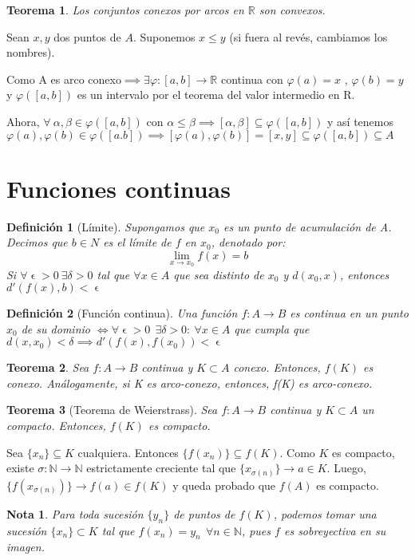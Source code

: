 \documentclass[11pt, a4paper]{article}
\makeatletter
\let\epsilon\upvarepsilon
\renewenvironment{proof}[1][\proofname] {\vspace{-15pt}\par\pushQED{\qed}\normalfont\topsep6\p@\@plus6\p@\relax\trivlist\item[\hskip\labelsep\it#1\@addpunct{.}]\ignorespaces}{\popQED\endtrivlist\@endpefalse}
\newcommand{\R}{\mathbb{R}}
\theoremstyle{theorem-style}
\newtheorem*{nth}{Teorema}
\theoremstyle{definition-style}
\newtheorem*{ndef}{Definición}
\theoremstyle{remark-style}
\newtheorem*{nota}{Nota}
\theoremstyle{example-style}
\makeatother
\begin{document}
\begin{nth}
	Los conjuntos conexos por arcos en $\mathbb{R}$ son convexos.
\end{nth}
\begin{proof}
Sean $x,y$ dos puntos de $A$. Suponemos $x \leq y$ (si fuera al revés, cambiamos los nombres).

Como A es arco conexo$\implies \exists \varphi:[a,b]\to \R$ continua con $\varphi(a) = x$	, $\varphi(b) = y$ y $\varphi([a,b])$ es un intervalo por el teorema del valor intermedio en R.

Ahora, $\forall \ \alpha, \beta \in \varphi([a,b])$ con $\alpha \leq \beta \implies [\alpha,\beta ]  \subseteq \varphi([a,b]) $ y así tenemos $\varphi(a), \varphi(b) \in \varphi([a.b]) \implies [\varphi(a),\varphi(b)] = [x,y] \subseteq \varphi([a,b])\subseteq A$
\end{proof}



\section{Funciones continuas}

\begin{ndef}[Límite]
	Supongamos que $x_0$ es un punto de acumulación de A. Decimos que $b\in N$ es el límite de $f$ en $x_0$, denotado por:
	\[
	\lim_{x\to x_0}f(x) = b
	\]
	Si $\forall\epsilon > 0  \ \exists \delta > 0 $ tal que $\forall x \in A$ que sea distinto de $x_0$ y $d(x_0,x)$, entonces $d'(f(x),b) < \epsilon$ 
\end{ndef}

\begin{ndef}[Función continua]
	Una función $f:A \to B$ es continua en un punto $x_0$ de su dominio $\iff \forall \epsilon > 0 \ \ \exists \delta > 0 : \ \forall x \in A$ que cumpla que $d(x,x_0)< \delta \implies d'(f(x),f(x_0)) < \epsilon$
\end{ndef}

\begin{nth}
	Sea $f:A \to B$ continua y $K \subset A$ conexo. Entonces, $f(K)$ es conexo. Análogamente, si K es arco-conexo, entonces, f(K) es arco-conexo.
\end{nth}

\begin{nth}[Teorema de Weierstrass]
Sea $f:A \to B$ continua y $K\subset A$ un compacto. Entonces, $f(K)$ es compacto.	
\end{nth}
\begin{proof}
	Sea $\{x_n\}\subseteq K$ cualquiera. Entonces $\{f(x_n)\} \subseteq f(K)$. Como $K$ es compacto, existe $\sigma: \mathbb{N} \rightarrow \mathbb{N}$ estrictamente creciente tal que $\{x_{\sigma(n)}\} \rightarrow a\in K$. Luego, $\{f(x_{\sigma(n)})\}\rightarrow f(a)\in f(K)$ y queda probado que $f(A)$ es compacto.

\begin{nota}
	Para toda sucesión $\{y_n\}$ de puntos de $f(K)$, podemos tomar una sucesión $\{x_n\}\subset K$ tal que $f(x_n) = y_n\ \ \forall n\in \mathbb{N}$, pues $f$ es sobreyectiva en su imagen.
\end{nota}
\end{proof}
\end{document}
